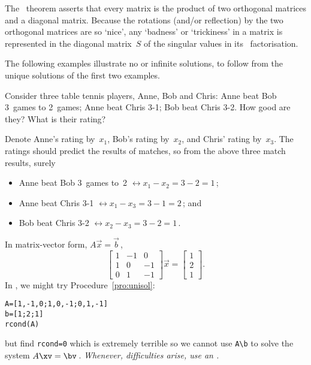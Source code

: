 The \svd\ theorem asserts that every matrix is the product of two orthogonal matrices and a diagonal matrix.  
Because the rotations (and/or reflection) by the two orthogonal matrices are so `nice', any `badness' or `trickiness' in a matrix is represented in the diagonal matrix~\(S\) of the singular values in its \svd\ factorisation.


\begin{aside}
The following examples illustrate no or infinite solutions, to follow from the unique solutions of the first two examples.
\end{aside}


\begin{example} \label{eg:rstp}
    Consider three table tennis players, Anne, Bob and Chris:
        Anne beat Bob 3~games to 2~games;
        Anne beat Chris 3-1;
        Bob beat Chris 3-2.
	How good are they?  What is their rating?  
    
\begin{solution} 
    Denote Anne's rating by~$x_1$, Bob's rating by~$x_2$, and Chris' 
    rating by~$x_3$.    
	The ratings should predict the results of matches, so from the
	above three match results, surely
	\begin{itemize}
\item Anne beat Bob 3~games to~2 \(\leftrightarrow x_1-x_2=3-2=1\)\,;
\item Anne beat Chris 3-1 \(\leftrightarrow x_1-x_3=3-1=2\)\,; and
\item Bob beat Chris 3-2 \(\leftrightarrow x_2-x_3=3-2=1\)\,.
\end{itemize}
    In matrix-vector form, $A\vec x=\vec b$\,,
    \begin{displaymath}
        \begin{bmatrix}
            1&-1&0\\ 1&0&-1\\ 0&1&-1
        \end{bmatrix}\vec x=
        \begin{bmatrix}
            1\\ 2\\ 1
        \end{bmatrix}.
    \end{displaymath}
\setbox\ajrqrbox\hbox{}%
\marginpar{\usebox{\ajrqrbox\\[2ex]}}%
In \script,  we might try Procedure~\ref{pro:unisol}:
\begin{verbatim}
A=[1,-1,0;1,0,-1;0,1,-1]
b=[1;2;1]
rcond(A)
\end{verbatim}
but find \verb|rcond=0| which is extremely terrible so we cannot use \verb|A\b| to solve the system \(A\xv=\bv\)\,.
\emph{Whenever, difficulties arise, use an \svd.}


\end{solution}
\end{example}
